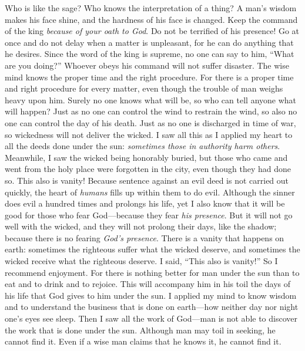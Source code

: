 \begin{biblechapter} %
 Who is like the sage? 
Who knows the interpretation of a thing? 
A man’s wisdom makes his face shine, 
and the hardness of his face is changed.
\verse Keep the command of the king 
\textit{because of your oath to God}.
\verse Do not be terrified of his presence! 
Go at once and do not delay when a matter is unpleasant, 
for he can do anything that he desires.
\verse Since the word of the king is supreme, 
no one can say to him, “What are you doing?”
\verse Whoever obeys his command will not suffer disaster. 
The wise mind knows the proper time and the right procedure.
\verse For there is a proper time and right procedure for every matter, 
even though the trouble of man weighs heavy upon him.
 Surely no one knows what will be, 
so who can tell anyone what will happen?
\verse Just as no one can control the wind to restrain the wind, 
so also no one can control the day of his death. 
Just as no one is discharged in time of war, 
so wickedness will not deliver the wicked.
 I saw all this as I applied my heart to all the deeds done under the sun: \textit{sometimes those in authority harm others}.
\verse Meanwhile, I saw the wicked being honorably buried, but those who came and went from the holy place were forgotten in the city, even though they had done so. This also is vanity!
 Because sentence against an evil deed is not carried out quickly, the heart of \textit{humans} fills up within them to do evil.
\verse Although the sinner does evil a hundred times and prolongs his life, yet I also know that it will be good for those who fear God—because they fear \textit{his presence}.
\verse But it will not go well with the wicked, and they will not prolong their days, like the shadow; because there is no fearing \textit{God’s presence}.
\verse There is a vanity that happens on earth: sometimes the righteous suffer what the wicked deserve, and sometimes the wicked receive what the righteous deserve. I said, “This also is vanity!”
 So I recommend enjoyment. For there is nothing better for man under the sun than to eat and to drink and to rejoice. This will accompany him in his toil the days of his life that God gives to him under the sun.
 I applied my mind to know wisdom and to understand the business that is done on earth—how neither day nor night one’s eyes see sleep.
\verse Then I saw all the work of God—man is not able to discover the work that is done under the sun. Although man may toil in seeking, he cannot find it. Even if a wise man claims that he knows it, he cannot find it.
\end{biblechapter}

